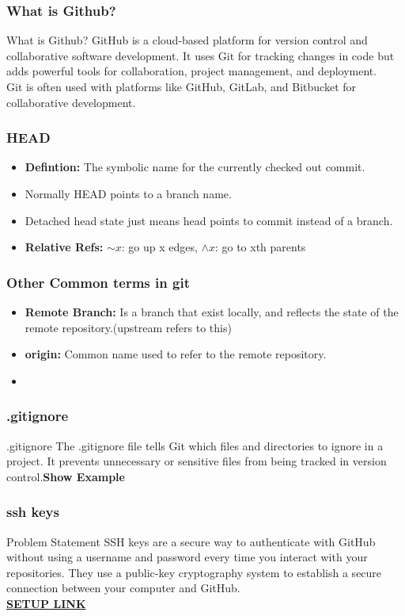 \documentclass{beamer}
\begin{document}
\begin{frame}\frametitle{What is Github?}
\begin{block}{What is Github?}
GitHub is a cloud-based platform for version control and collaborative software
development. It uses Git for tracking changes in code but adds powerful tools 
for collaboration, project management, and deployment.\\
Git is often used with platforms like GitHub, GitLab, and Bitbucket for 
collaborative development. 
\end{block}
\end{frame}


\begin{frame}\frametitle{HEAD}
\begin{itemize}
\item \textbf{Defintion:} The symbolic name for the currently checked out commit.
\item Normally HEAD points to a branch name.
\item Detached head state just means head points to commit instead of a branch.
\item \textbf{Relative Refs:} $\sim x$: go up x edges,  $\wedge x$: go to xth parents 
\end{itemize}
\end{frame}


\begin{frame}\frametitle{Other Common terms in git}
\begin{itemize}
\item \textbf{Remote Branch:} Is a branch that exist locally, and reflects the state of the remote repository.(upstream refers to this)
\item \textbf{origin:} Common name used to refer to the remote repository.
\item 
\end{itemize}
\end{frame}


\begin{frame}\frametitle{.gitignore}
\begin{block}{.gitignore}
The .gitignore file tells Git which files and directories to ignore in a 
project. It prevents unnecessary or sensitive files from being tracked in
version control.\textbf{Show Example}
\end{block}
\end{frame}
    

\begin{frame}\frametitle{ssh keys}
\begin{block}{Problem Statement}
SSH keys are a secure way to authenticate with GitHub without using a username
and password every time you interact with your repositories. They use a 
public-key cryptography system to establish a secure connection between your
computer and GitHub.\\ 
\href{https://docs.github.com/en/authentication/connecting-to-github-with-ssh/adding-a-new-ssh-key-to-your-github-account}{\textbf{SETUP LINK}}
\end{block}
\end{frame}
\end{document}
